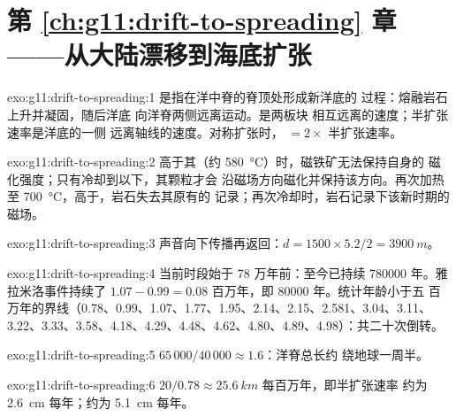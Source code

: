 \section*{第 \ref{ch:g11:drift-to-spreading} 章——从大陆漂移到海底扩张}

\begin{solution}{exo:g11:drift-to-spreading:1}
是指在洋中脊的脊顶处形成新洋底的
过程：熔融岩石上升并凝固，随后洋底
向洋脊两侧远离运动。是两板块
相互远离的速度；半扩张速率是洋底的一侧
远离轴线的速度。对称扩张时， $= 2
\times$ 半扩张速率。
\end{solution}

\begin{solution}{exo:g11:drift-to-spreading:2}
高于其（约 \qty{580}{\celsius}）时，磁铁矿无法保持自身的
磁化强度；只有冷却到以下，其颗粒才会
沿磁场方向磁化并保持该方向。再次加热至
\qty{700}{\celsius}，高于，岩石失去其原有的
记录；再次冷却时，岩石记录下该新时期的磁场。
\end{solution}

\begin{solution}{exo:g11:drift-to-spreading:3}
声音向下传播再返回：$d = 1500 \times 5.2/2 = \qty{3900}{m}$。
\end{solution}

\begin{solution}{exo:g11:drift-to-spreading:4}
当前时段始于 78 万年前：至今已持续
\num{780000} 年。雅拉米洛事件持续了 $1.07 - 0.99 = \num{0.08}$
百万年，即 \num{80000} 年。统计年龄小于五
百万年的界线（0.78、0.99、1.07、1.77、1.95、2.14、2.15、2.581、3.04、3.11、
3.22、3.33、3.58、4.18、4.29、4.48、4.62、4.80、4.89、4.98）：共二十次倒转。
\end{solution}

\begin{solution}{exo:g11:drift-to-spreading:5}
$65\,000/40\,000 \approx 1.6$：洋脊总长约
绕地球一周半。
\end{solution}

\begin{solution}{exo:g11:drift-to-spreading:6}
$20/0.78 \approx \qty{25.6}{km}$ 每百万年，即半扩张速率
约为 \qty{2.6}{cm} 每年；约为 \qty{5.1}{cm} 每年。
\end{solution}

